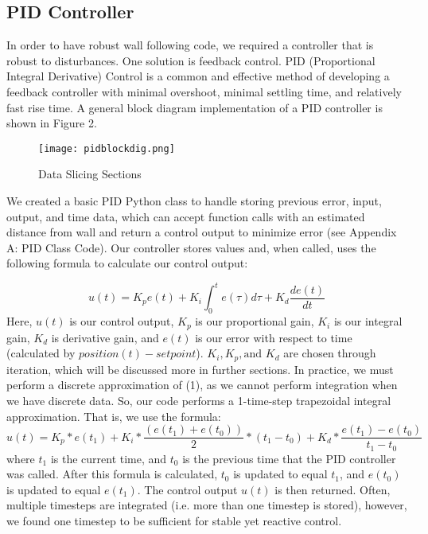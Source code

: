 \documentclass{article}
\begin{document}
\subsection{PID Controller}
In order to have robust wall following code, we required a controller that is robust to disturbances. One solution is feedback control. PID (Proportional Integral Derivative) Control is a common and effective method of developing a feedback controller with minimal overshoot, minimal settling time, and relatively fast rise time. A general block diagram implementation of a PID controller is shown in Figure 2. 

\begin{figure}[h]
\begin{center}
\texttt{[image: pidblockdig.png]} %
\caption{Data Slicing Sections}
\end{center}
\label{workflow}
\end{figure}

We created a basic PID Python class to handle storing previous error, input, output, and time data, which can accept function calls with an estimated distance from wall and return a control output to minimize error (see Appendix A: PID Class Code). Our controller stores values and, when called, uses the following formula to calculate our control output:

\begin{equation}
    u(t)=K_pe(t)+K_i\int_0^te(\tau)d\tau + K_d\frac{de(t)}{dt}
\end{equation}
Here, $u(t)$ is our control output, $K_p$ is our proportional gain, $K_i$ is our integral gain, $K_d$ is derivative gain, and $e(t)$ is our error with respect to time (calculated by $position(t)-setpoint$). $K_i, K_p, \textrm{and } K_d$ are chosen through iteration, which will be discussed more in further sections. In practice, we must perform a discrete approximation of (1), as we cannot perform integration when we have discrete data. So, our code performs a 1-time-step trapezoidal integral approximation. That is, we use the formula:
\begin{equation}
    u(t) = K_p*e(t_{1})+K_i*\frac{(e(t_1)+e(t_0))}{2}*(t_1-t_0)+K_d*\frac{e(t_1)-e(t_0)}{t_1-t_0}
\end{equation}
where $t_1$ is the current time, and $t_0$ is the previous time that the PID controller was called. After this formula is calculated, $t_0$ is updated to equal $t_1$, and $e(t_0)$ is updated to equal $e(t_1)$. The control output $u(t)$ is then returned. Often, multiple timesteps are integrated (i.e. more than one timestep is stored), however, we found one timestep to be sufficient for stable yet reactive control.
\end{document}
